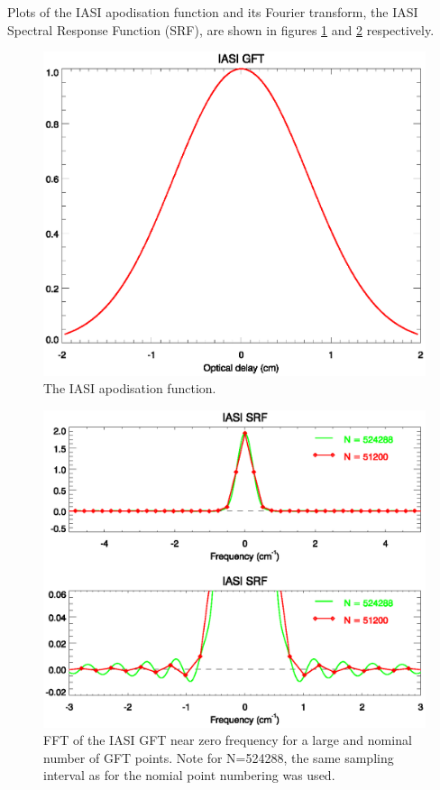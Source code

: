 Plots of the IASI apodisation function and its Fourier transform, the IASI Spectral Response Function (SRF), are shown in figures \ref{fig:iasi_gft} and \ref{fig:iasi_srf} respectively.

\begin{figure}[htp]
  \centering
  \includegraphics[scale=0.8]{graphics/IASI_GFT.eps}
  \caption{The IASI apodisation function.}
  \label{fig:iasi_gft}
\end{figure}

\begin{figure}[htp]
  \centering
  \includegraphics[scale=0.8]{graphics/IASI_SRF.eps}
  \caption{FFT of the IASI GFT near zero frequency for a large and nominal number of GFT points. Note for N=524288, the same sampling interval as for the nomial point numbering was used.}
  \label{fig:iasi_srf}
\end{figure}

